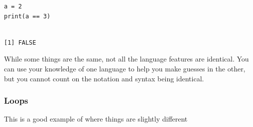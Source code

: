 \documentclass{article}
\begin{document}
\begin{verbatim}
a = 2
print(a == 3)
\end{verbatim}

\begin{verbatim}

[1] FALSE
\end{verbatim}

While some things are the same, not all the language features are identical. You can use your knowledge of one language to help you make guesses in the other, but you cannot count on the notation and syntax being identical.
\subsubsection{Loops}
\label{sec:org5f020d6}
This is a good example of where things are slightly different
\end{document}
